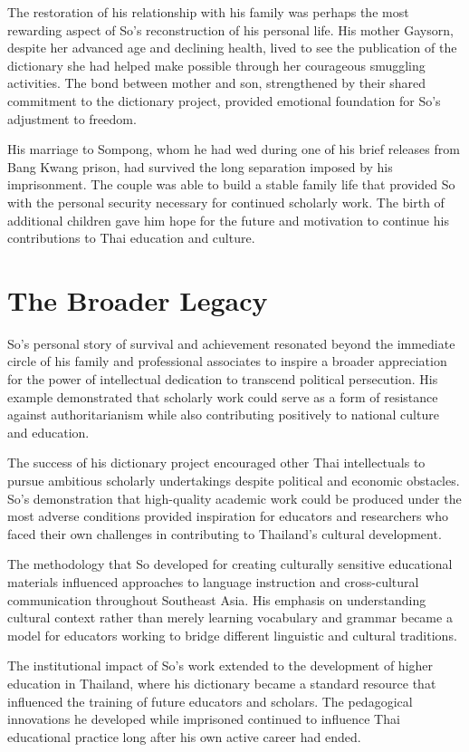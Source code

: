 \documentclass[
  Letterpaper,
]{scrbook}
\begin{document}
The restoration of his relationship with his family was perhaps the most
rewarding aspect of So's reconstruction of his personal life. His mother
Gaysorn, despite her advanced age and declining health, lived to see the
publication of the dictionary she had helped make possible through her
courageous smuggling activities. The bond between mother and son,
strengthened by their shared commitment to the dictionary project,
provided emotional foundation for So's adjustment to freedom.

His marriage to Sompong, whom he had wed during one of his brief
releases from Bang Kwang prison, had survived the long separation
imposed by his imprisonment. The couple was able to build a stable
family life that provided So with the personal security necessary for
continued scholarly work. The birth of additional children gave him hope
for the future and motivation to continue his contributions to Thai
education and culture.

\section{The Broader Legacy}\label{the-broader-legacy}

So's personal story of survival and achievement resonated beyond the
immediate circle of his family and professional associates to inspire a
broader appreciation for the power of intellectual dedication to
transcend political persecution. His example demonstrated that scholarly
work could serve as a form of resistance against authoritarianism while
also contributing positively to national culture and education.

The success of his dictionary project encouraged other Thai
intellectuals to pursue ambitious scholarly undertakings despite
political and economic obstacles. So's demonstration that high-quality
academic work could be produced under the most adverse conditions
provided inspiration for educators and researchers who faced their own
challenges in contributing to Thailand's cultural development.

The methodology that So developed for creating culturally sensitive
educational materials influenced approaches to language instruction and
cross-cultural communication throughout Southeast Asia. His emphasis on
understanding cultural context rather than merely learning vocabulary
and grammar became a model for educators working to bridge different
linguistic and cultural traditions.

The institutional impact of So's work extended to the development of
higher education in Thailand, where his dictionary became a standard
resource that influenced the training of future educators and scholars.
The pedagogical innovations he developed while imprisoned continued to
influence Thai educational practice long after his own active career had
ended.
\end{document}
